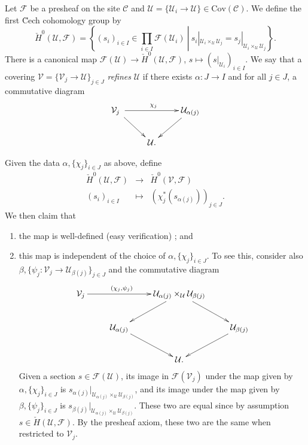 \begin{definition}
Let $\mathcal{F}$ be a presheaf on the site $\mathcal{C}$ and $\mathcal{U} = \{ 
\mathcal{U}_i \to \mathcal{U}\} \in \text{Cov} (\mathcal{C})$. We define the 
first \u Cech cohomology group by
$$
\check H^0 (\mathcal{U}, \mathcal{F}) = \left\{\left.  (s_i)_{i\in I} \in 
\prod_{i\in I }\mathcal{F}(\mathcal{U}_i) \ \right| \ s_i 
|_{\mathcal{U}_i \times_\mathcal{U} \mathcal{U}_j} = s_j |_{\mathcal{U}_i 
\times_\mathcal{U} \mathcal{U}_j} \right\}.
$$
There is a canonical map $ \mathcal{F}(\mathcal{U}) \to \check H^0 
(\mathcal{U}, \mathcal{F})$, $s \mapsto (s |_{\mathcal{U}_i})_{i\in I}.$
We say that a covering $\mathcal{V} = \{ \mathcal{V}_j \to \mathcal{U}\}_{j \in 
J}$ \emph{refines} $\mathcal{U}$ if there exists $\alpha : J \to I$ and for all 
$j \in J$, a commutative diagram
$$
\xymatrix{
{\mathcal{V}_j\ } \ar^{\chi_j}[rr] \ar[dr] & &{\mathcal{U}_{\alpha(j)}} \ar[dl] 
\\
& {\mathcal{U}.}
}
$$ 
\end{definition}

\noindent
Given the data $\alpha, \{\chi_j\}_{i\in J}$ as above, define
\begin{eqnarray*}
\check H^0 (\mathcal{U}, \mathcal{F}) & \to & \check H^0 (\mathcal{V}, 
\mathcal{F}) \\
(s_i)_{i\in I} & \mapsto & \left(\chi_j^*\left(s 
_{\alpha(j)}\right)\right)_{j\in J}.
\end{eqnarray*}
We then claim that 
\begin{enumerate}
\item the map is well-defined (easy verification) ; and
\item this map is independent of the choice of $\alpha, \{\chi_j\}_{i\in J}$. 
To see this, consider also $\beta, \{\psi_j : \mathcal{V}_j \to 
\mathcal{U}_{\beta(j)}\}_{j \in J}$ and the commutative diagram
$$
\xymatrix{
{\mathcal{V}_j}  \ar^{(\chi_j, \psi_j)\qquad}[rr] & & 
{\mathcal{U}_{\alpha(j)}\times_\mathcal{U} \mathcal{U}_{\beta(j)}} \ar[dl] 
\ar[dr] \\
& {\mathcal{U}_{\alpha(j)}} \ar[dr] && {\mathcal{U}_{\beta(j)}} \ar[dl] \\
& &{\mathcal{U}.}
}
$$
Given a section $s \in \mathcal{F}(\mathcal{U})$, its image in 
$\mathcal{F}(\mathcal{V}_j)$ under the map given by $\alpha, \{\chi_j\}_{i\in 
J}$ is $s_{\alpha(j)} | _{{\mathcal{U}_{\alpha(j)}\times_\mathcal{U} 
\mathcal{U}_{\beta(j)}}}$, and its image under the map given by $\beta, 
\{\psi_j\}_{i\in J}$ is $s_{\beta(j)} | 
_{{\mathcal{U}_{\alpha(j)}\times_\mathcal{U} \mathcal{U}_{\beta(j)}}}$. These 
two are equal since by assumption $s \in \check H(\mathcal{U}, \mathcal{F})$. 
By the presheaf axiom, these two are the same when restricted to 
$\mathcal{V}_j$.
\end{enumerate}

